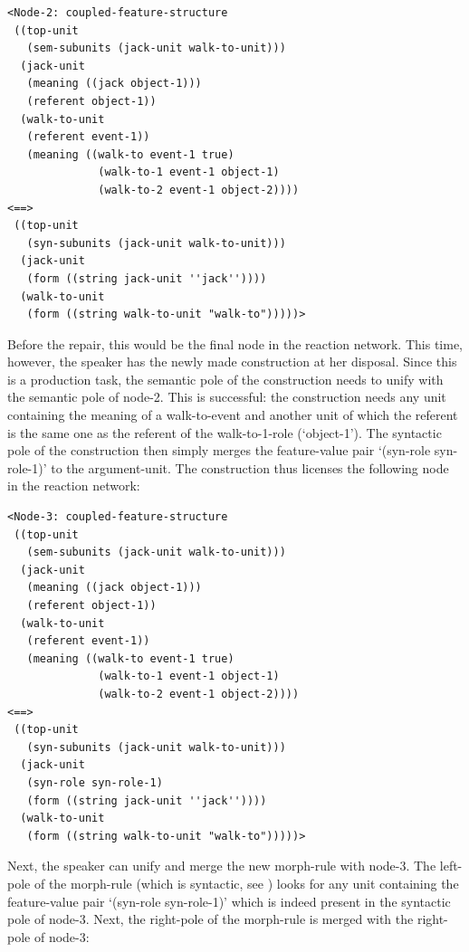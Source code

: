 \ea
\begin{lstlisting}
<Node-2: coupled-feature-structure
 ((top-unit
   (sem-subunits (jack-unit walk-to-unit)))
  (jack-unit
   (meaning ((jack object-1)))
   (referent object-1))
  (walk-to-unit
   (referent event-1))
   (meaning ((walk-to event-1 true)
              (walk-to-1 event-1 object-1)
              (walk-to-2 event-1 object-2))))
<==>
 ((top-unit
   (syn-subunits (jack-unit walk-to-unit)))
  (jack-unit
   (form ((string jack-unit ''jack''))))
  (walk-to-unit
   (form ((string walk-to-unit "walk-to")))))>
\end{lstlisting}
\z


Before the repair, this would be the final node in the reaction network. This time, however, the speaker has the newly made construction at her disposal. Since this is a production task, the semantic pole of the construction needs to unify with the semantic pole of node-2. This is successful: the construction needs any unit containing the meaning of a walk-to-event and another unit of which the referent is the same one as the referent of the walk-to-1-role (`object-1'). The syntactic pole of the construction then simply merges the feature-value pair `(syn-role syn-role-1)' to the argument-unit. The construction thus licenses the following node in the reaction network:


\ea
\begin{lstlisting}
<Node-3: coupled-feature-structure
 ((top-unit
   (sem-subunits (jack-unit walk-to-unit)))
  (jack-unit
   (meaning ((jack object-1)))
   (referent object-1))
  (walk-to-unit
   (referent event-1))
   (meaning ((walk-to event-1 true)
              (walk-to-1 event-1 object-1)
              (walk-to-2 event-1 object-2))))
<==>
 ((top-unit
   (syn-subunits (jack-unit walk-to-unit)))
  (jack-unit
   (syn-role syn-role-1)
   (form ((string jack-unit ''jack''))))
  (walk-to-unit
   (form ((string walk-to-unit "walk-to")))))>
\end{lstlisting}
\z


\newpage
Next, the speaker can unify and merge the new morph-rule with node-3. The left-pole of the morph-rule (which is syntactic, see ) looks for any unit containing the feature-value pair `(syn-role syn-role-1)' which is indeed present in the syntactic pole of node-3. Next, the right-pole of the morph-rule is merged with the right-pole of node-3:


